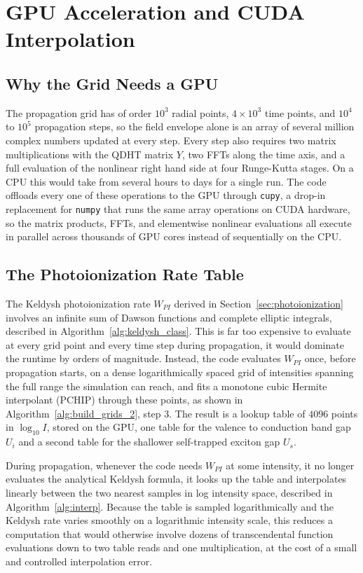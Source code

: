 \section{GPU Acceleration and CUDA Interpolation}
\label{sec:cuda}

\subsection{Why the Grid Needs a GPU}

The propagation grid has of order $10^3$ radial points, $4\times10^3$ time points, and $10^4$ to $10^5$ propagation steps, so the field envelope alone is an array of several million complex numbers updated at every step. Every step also requires two matrix multiplications with the QDHT matrix $Y$, two FFTs along the time axis, and a full evaluation of the nonlinear right hand side at four Runge-Kutta stages. On a CPU this would take from several hours to days for a single run. The code offloads every one of these operations to the GPU through \texttt{cupy}, a drop-in replacement for \texttt{numpy} that runs the same array operations on CUDA hardware, so the matrix products, FFTs, and elementwise nonlinear evaluations all execute in parallel across thousands of GPU cores instead of sequentially on the CPU.

\subsection{The Photoionization Rate Table}

The Keldysh photoionization rate $W_{PI}$ derived in Section~\ref{sec:photoionization} involves an infinite sum of Dawson functions and complete elliptic integrals, described in Algorithm~\ref{alg:keldysh_class}. This is far too expensive to evaluate at every grid point and every time step during propagation, it would dominate the runtime by orders of magnitude. Instead, the code evaluates $W_{PI}$ once, before propagation starts, on a dense logarithmically spaced grid of intensities spanning the full range the simulation can reach, and fits a monotone cubic Hermite interpolant (PCHIP) through these points, as shown in Algorithm~\ref{alg:build_grids_2}, step 3. The result is a lookup table of $4096$ points in $\log_{10} I$, stored on the GPU, one table for the valence to conduction band gap $U_i$ and a second table for the shallower self-trapped exciton gap $U_s$.

During propagation, whenever the code needs $W_{PI}$ at some intensity, it no longer evaluates the analytical Keldysh formula, it looks up the table and interpolates linearly between the two nearest samples in log intensity space, described in Algorithm~\ref{alg:interp}. Because the table is sampled logarithmically and the Keldysh rate varies smoothly on a logarithmic intensity scale, this reduces a computation that would otherwise involve dozens of transcendental function evaluations down to two table reads and one multiplication, at the cost of a small and controlled interpolation error.

